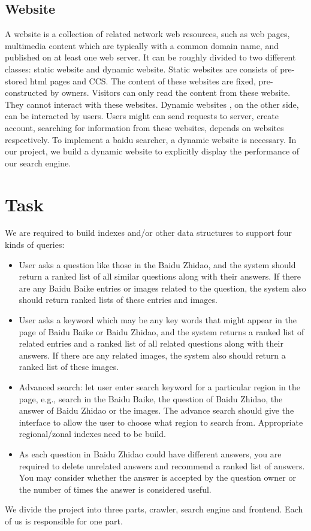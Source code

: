\documentclass[10pt,times,twocolumn]{article}
\begin{document}
\subsection{Website}
A website is a collection of related network web resources, such as web pages, multimedia content which are typically with a common domain name, and published on at least one web server. \cite{wiki:website} It can be roughly divided to two different classes: static website and dynamic website.
\newline
Static websites are consists of pre-stored html pages and CCS. The content of these websites are fixed, pre-constructed by owners. Visitors can only read the content from these website. They cannot interact with these websites.
\newline
Dynamic websites , on the other side, can be interacted by users. Users might can send requests to server, create account, searching for information from these websites, depends on websites respectively. 
\newline
To implement a baidu searcher, a dynamic website is necessary. In our project,  we build a dynamic website to explicitly display the performance of our search engine.


\section{Task}
We are required to build indexes and/or other data structures to support four kinds of queries:
\begin{itemize}
    \item User asks a question like those in the Baidu Zhidao, and the system should return a ranked list of all similar questions along with their answers. If there are any Baidu Baike entries or images related to the question, the system also should return ranked lists of these entries and images. 
    \item User asks a keyword which may be any key words that might appear in the page of Baidu Baike or Baidu Zhidao, and the system returns a ranked list of related entries and a ranked list of all related questions along with their answers. If there are any related images, the system also should return a ranked list of these images. 
    \item Advanced search: let user enter search keyword for a particular region in the page, e.g., search in the Baidu Baike, the question of Baidu Zhidao, the answer of Baidu Zhidao or the images. The advance search should give the interface to allow the user to choose what region to search from. Appropriate regional/zonal indexes need to be build. 
    \item As each question in Baidu Zhidao could have different answers, you are required to delete unrelated answers and recommend a ranked list of answers. You may consider whether the answer is accepted by the question owner or the number of times the answer is considered useful.
\end{itemize}
We divide the project into three parts, crawler, search engine and frontend. Each of us 
is responsible for one part.
\end{document}
